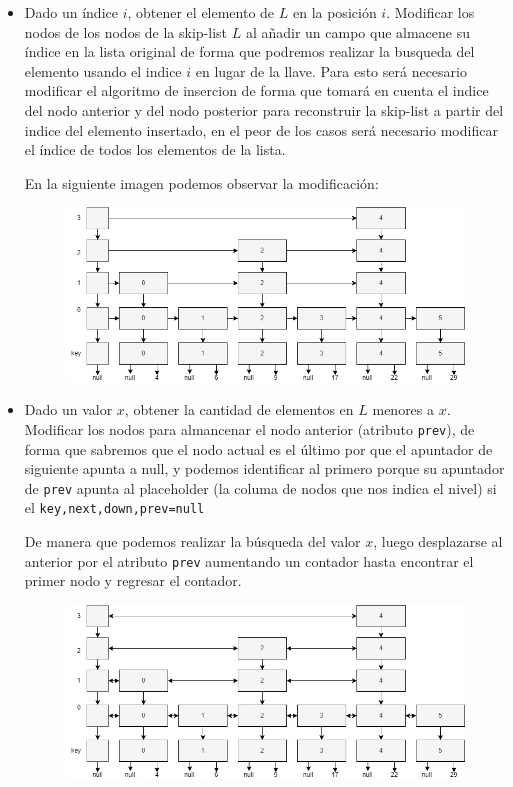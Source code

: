 \begin{itemize}
  \item Dado un índice $i$, obtener el elemento de $L$ en la posición $i$.
  Modificar los nodos de los nodos de la skip-list $L$ al añadir un campo que almacene su índice en la lista original de forma que podremos realizar la busqueda del elemento usando el indice $i$ en lugar de la llave. Para esto será necesario modificar el algoritmo de insercion de forma que tomará en cuenta el indice del nodo anterior y del nodo posterior para reconstruir la skip-list a partir del indice del elemento insertado, en el peor de los casos será necesario modificar el índice de todos los elementos de la lista.

  
  En la siguiente imagen podemos observar la modificación:

  \begin{figure}[!h]
    \centering
    \includegraphics[width=\textwidth]{t1-5.png}
  \end{figure}


  \item Dado un valor $x$, obtener la cantidad de elementos en $L$ menores a $x$.
  Modificar los nodos para almancenar el nodo anterior (atributo \texttt{prev}), de forma que sabremos que el nodo actual es el último por que el apuntador de siguiente apunta a null, y podemos identificar al primero porque su apuntador de \texttt{prev} apunta al placeholder (la columa de nodos que nos indica el nivel) si el \texttt{key,next,down,prev=null}

  De manera que podemos realizar la búsqueda del valor $x$, luego desplazarse al anterior por el atributo \texttt{prev} aumentando un contador hasta encontrar el primer nodo y regresar el contador.


  \begin{figure}[!h]
    \centering
    \includegraphics[width=\textwidth]{t1-6.jpg}
    
  \end{figure}

  \end{itemize}

\bigskip
